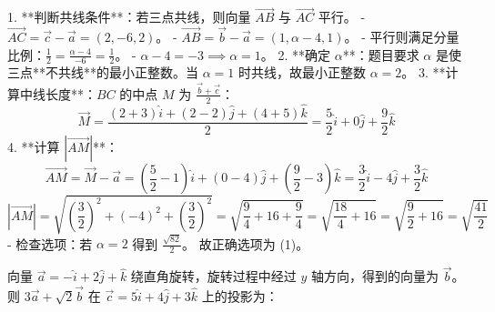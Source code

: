 \begin{questions}
\begin{solution}
1. **判断共线条件**：若三点共线，则向量 $\vec{AB}$ 与 $\vec{AC}$ 平行。
   - $\vec{AC} = \vec{c} - \vec{a} = (2, -6, 2)$。
   - $\vec{AB} = \vec{b} - \vec{a} = (1, \alpha-4, 1)$。
   - 平行则满足分量比例：$\frac{1}{2} = \frac{\alpha-4}{-6} = \frac{1}{2}$。
   - $\alpha - 4 = -3 \implies \alpha = 1$。
2. **确定 $\alpha$**：题目要求 $\alpha$ 是使三点**不共线**的最小正整数。当 $\alpha = 1$ 时共线，故最小正整数 $\alpha = 2$。
3. **计算中线长度**：$BC$ 的中点 $M$ 为 $\frac{\vec{b} + \vec{c}}{2}$：
\[
\vec{M} = \frac{(2+3)\hat{i} + (2-2)\hat{j} + (4+5)\hat{k}}{2} = \frac{5}{2}\hat{i} + 0\hat{j} + \frac{9}{2}\hat{k}
\]
4. **计算 $|\vec{AM}|$**：
\[
\vec{AM} = \vec{M} - \vec{a} = \left(\frac{5}{2}-1\right)\hat{i} + (0-4)\hat{j} + \left(\frac{9}{2}-3\right)\hat{k} = \frac{3}{2}\hat{i} - 4\hat{j} + \frac{3}{2}\hat{k}
\]
\[
|\vec{AM}| = \sqrt{\left(\frac{3}{2}\right)^2 + (-4)^2 + \left(\frac{3}{2}\right)^2} = \sqrt{\frac{9}{4} + 16 + \frac{9}{4}} = \sqrt{\frac{18}{4} + 16} = \sqrt{\frac{9}{2} + 16} = \sqrt{\frac{41}{2}}
\]
   - 检查选项：若 $\alpha=2$ 得到 $\frac{\sqrt{82}}{2}$。
故正确选项为 (1)。
\end{solution}
\question
向量 $\vec{a} = -\hat{i} + 2\hat{j} + \hat{k}$ 绕直角旋转，旋转过程中经过 $y$ 轴方向，得到的向量为 $\vec{b}$。则 $3\vec{a} + \sqrt{2}\vec{b}$ 在 $\vec{c} = 5\hat{i} + 4\hat{j} + 3\hat{k}$ 上的投影为：


\end{questions}
